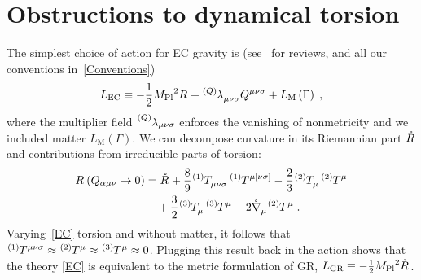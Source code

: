 \documentclass[aps,prd,reprint,preprintnumbers,showpacs,floatfix,nofootinbib,superscript address,longbibliography]{revtex4-1}
\begin{document}
\section{Obstructions to dynamical torsion}
The simplest choice of action for EC gravity is (see~\cite{Hehl:1976kj, Shapiro:2001rz, Blagojevic:2002, Blagojevic:2012bc} for reviews, and all our conventions in~\cref{Conventions})
\begin{equation} \label{EC}
	L_{\text{EC}}  \equiv -\frac{1}{2} \Planck^2 \rcR{} 	+ \TLambda[Q]{_{\mu\nu\sigma}}Q{^{\mu\nu\sigma}}+L_{\text{M}}\left(\Gamma\right) \;,
\end{equation}
where the multiplier field $\TLambda[Q]{_{\mu\nu\sigma}}$ enforces the vanishing of nonmetricity and we included matter $L_{\text{M}}\left(\Gamma\right)$. We can decompose curvature in its Riemannian part $\rR{}$ and contributions from irreducible parts of torsion:
	\begin{align}
		\rcR{}\left(Q_{\alpha\mu\nu}\to 0\right) & = \rR{}
		+
		\frac{8}{9}
		\T[1]{_{\mu\nu\sigma}}
		\T[1]{^{\mu[\nu\sigma]}}
		-
		\frac{2}{3}
		\T[2]{_{\mu}}
		\T[2]{^{\mu}}	
		\nonumber\\
		&\ \ \ 
		+
		\frac{3}{2}
		\T[3]{_{\mu}}
		\T[3]{^{\mu}}	
		-
		2\rD{_\mu}\T[2]{^\mu} \;.
\label{decomposition}
	\end{align}
Varying~\cref{EC} \wrt torsion and without matter, it follows that $\T[1]{^{\mu\nu\sigma}}\approx\T[2]{^{\mu}}\approx\T[3]{^{\mu}}\approx 0$. Plugging this result back in the action shows that the theory \eqref{EC} is equivalent to the metric formulation of GR, $L_{\text{GR}} \equiv -\frac{1}{2} \Planck^2 \rR{}$. 
\end{document}
